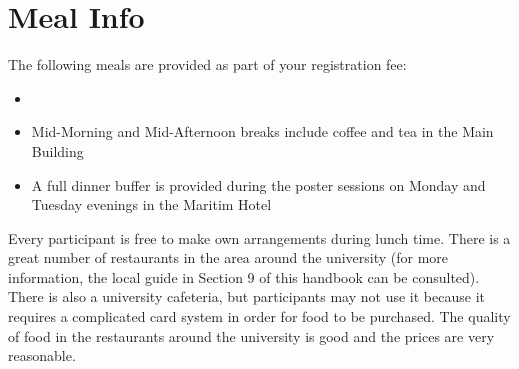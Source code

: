 \setheaders{}{}
\section{Meal Info}{}

The following meals are provided as part of your registration fee:

\begin{itemize}
\item 
\item Mid-Morning and Mid-Afternoon breaks include coffee and tea in the Main Building
\item A full dinner buffer is provided during the poster sessions on Monday and Tuesday evenings in the Maritim Hotel  
\end{itemize} 

Every participant is free to make own arrangements during lunch time. There is a great number of restaurants in the area around the university (for more information, the local guide in Section 9 of this handbook can be consulted). There is also a university cafeteria, but participants may not use it because it requires a complicated card system in order for food to be purchased. The quality of food in the restaurants around the university is good and the prices
are very reasonable.

